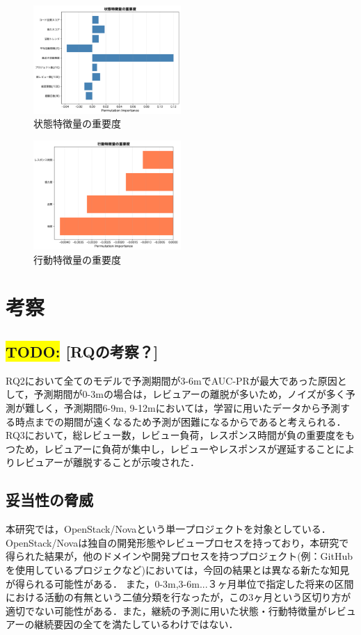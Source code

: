 \documentclass[submit,techrep,noauthor]{ipsj}
\newcommand{\todo}[1]{\colorbox{yellow}{{\bf TODO}:}{\color{red} {\textbf{[#1]}}}}
\begin{document}
\begin{figure}[h]
    \centering
\includegraphics[width=0.5\textwidth]{./Hashimoto_fig/state.pdf}
    \caption{状態特徴量の重要度}
    \label{fig:State}
\end{figure}

\begin{figure}[h]
    \centering
\includegraphics[width=0.5\textwidth]{./Hashimoto_fig/action.pdf}
    \caption{行動特徴量の重要度}
    \label{fig:Action}
\end{figure}


\section{考察}
\label{sec:discussion}
\subsection{\todo{RQの考察？}}
RQ2において全てのモデルで予測期間が3-6mでAUC-PRが最大であった原因として，予測期間が0-3mの場合は，レビュアーの離脱が多いため，ノイズが多く予測が難しく，予測期間6-9m, 9-12mにおいては，学習に用いたデータから予測する時点までの期間が遠くなるため予測が困難になるからであると考えられる．RQ3において，総レビュー数，レビュー負荷，レスポンス時間が負の重要度をもつため，レビュアーに負荷が集中し，レビューやレスポンスが遅延することによりレビュアーが離脱することが示唆された．

\subsection{妥当性の脅威}
本研究では，OpenStack/Novaという単一プロジェクトを対象としている．OpenStack/Novaは独自の開発形態やレビュープロセスを持っており，本研究で得られた結果が，他のドメインや開発プロセスを持つプロジェクト(例：GitHubを使用しているプロジェクなど)においては，今回の結果とは異なる新たな知見が得られる可能性がある．
また，0-3m,3-6m...３ヶ月単位で指定した将来の区間における活動の有無という二値分類を行なったが，この3ヶ月という区切り方が適切でない可能性がある．また，継続の予測に用いた状態・行動特徴量がレビュアーの継続要因の全てを満たしているわけではない．
\end{document}
